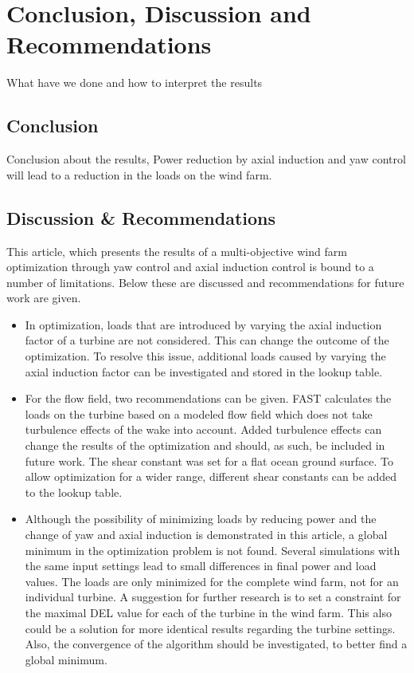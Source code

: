 \section{Conclusion, Discussion and Recommendations}
What have we done and how to interpret the results
\subsection{Conclusion}
Conclusion about the results, Power reduction by axial  induction and yaw control will lead to a reduction in the loads on the wind farm. 
 

\subsection{Discussion \& Recommendations}
This article, which presents the results of a multi-objective wind farm optimization through yaw control and axial induction control is bound to a number of limitations. Below these are discussed and recommendations for future work are given.
\begin{itemize}
	\item In optimization, loads that are introduced by varying the axial induction factor of a turbine are not considered. This can change the outcome of the optimization. To resolve this issue, additional loads caused by varying the axial induction factor can be investigated and stored in the lookup table.
	\item For the flow field, two recommendations can be given. FAST calculates the loads on the turbine based on a modeled flow field which does not take turbulence effects of the wake into account. Added turbulence effects can change the results of the optimization and should, as such, be included in future work. The shear constant was set for a flat ocean ground surface. To allow optimization for a wider range, different shear constants can be added to the lookup table.
	\item Although the possibility of minimizing loads by reducing power and the change of yaw and axial induction is demonstrated in this article, a global minimum in the optimization problem is not found. Several simulations with the same input settings lead to small differences in final power and load values. The loads are only minimized for the complete wind farm, not for an individual turbine. A suggestion for further research is to set a constraint for the maximal DEL value for each of the turbine in the wind farm. This also could be a solution for more identical results regarding the turbine settings. Also, the convergence of the algorithm should be investigated, to better find a global minimum.
\end{itemize}

